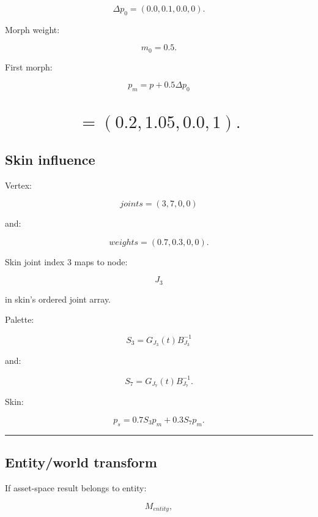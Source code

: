 \[
\Delta p_0=
(0.0,0.1,0.0,0).
\]

Morph weight:

\[
m_0=0.5.
\]

First morph:

\[
p_m
=
p+
0.5\Delta p_0
\]

\section{\texorpdfstring{\[
=
(0.2,1.05,0.0,1).
\]}{
=
(0.2,1.05,0.0,1).
}}\label{04-visual-computing-ii-ch041-section}

\hypertarget{04-visual-computing-ii-ch041-section}{}

\subsection{Skin influence}\label{04-visual-computing-ii-ch041-skin-influence}

\hypertarget{04-visual-computing-ii-ch041-skin-influence}{}

Vertex:

\[
joints=
(3,7,0,0)
\]

and:

\[
weights=
(0.7,0.3,0,0).
\]

Skin joint index 3 maps to node:

\[
J_3
\]

in skin's ordered joint array.

Palette:

\[
S_3=
G_{J_3}(t)
B_{J_3}^{-1}
\]

and:

\[
S_7=
G_{J_7}(t)
B_{J_7}^{-1}.
\]

Skin:

\[
\boxed{
p_s
=
0.7S_3p_m
+
0.3S_7p_m.
}
\]

\begin{center}\rule{0.5\linewidth}{0.5pt}\end{center}

\subsection{Entity/world transform}\label{04-visual-computing-ii-ch041-entityworld-transform}

\hypertarget{04-visual-computing-ii-ch041-entityworld-transform}{}

If asset-space result belongs to entity:

\[
M_{entity},
\]

